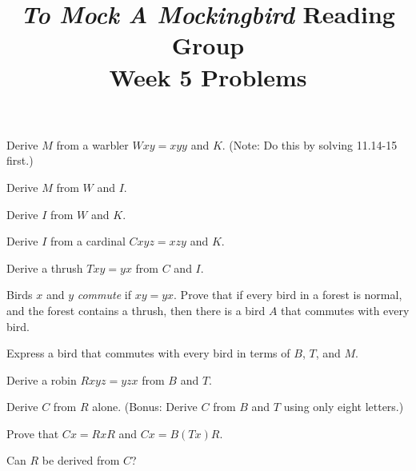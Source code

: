\documentclass[12pt, letterpaper]{article}
\title{\emph{To Mock A Mockingbird} Reading Group\\Week 5 Problems}
\begin{document}
\maketitle

\disclaimer

\begin{prob}{11.13}
Derive $M$ from a warbler $Wxy = xyy$ and $K$. (Note: Do this by solving 11.14-15 first.)
\end{prob}

\begin{prob}{11.14}
Derive $M$ from $W$ and $I$.
\end{prob}

\begin{prob}{11.15}
Derive $I$ from $W$ and $K$.
\end{prob}

\begin{prob}{11.16}
Derive $I$ from a cardinal $Cxyz = xzy$ and $K$.
\end{prob}

\begin{prob}{11.17}
Derive a thrush $Txy = yx$ from $C$ and $I$.
\end{prob}

\begin{prob}{11.18}
Birds $x$ and $y$ \emph{commute} if $xy = yx$. Prove that if every bird in a forest is normal, and the forest contains a thrush, then there is a bird $A$ that commutes with every bird.
\end{prob}

\begin{prob}{11.19}
Express a bird that commutes with every bird in terms of $B$, $T$, and $M$.
\end{prob}

\begin{prob}{11.20}
Derive a robin $Rxyz = yzx$ from $B$ and $T$.
\end{prob}

\begin{prob}{11.21}
Derive $C$ from $R$ alone. (Bonus: Derive $C$ from $B$ and $T$ using only eight letters.)
\end{prob}

\begin{prob}{11.22}
Prove that $Cx = RxR$ and $Cx = B(Tx)R$.
\end{prob}

\begin{prob}{11.23}
Can $R$ be derived from $C$?
\end{prob}
\end{document}
